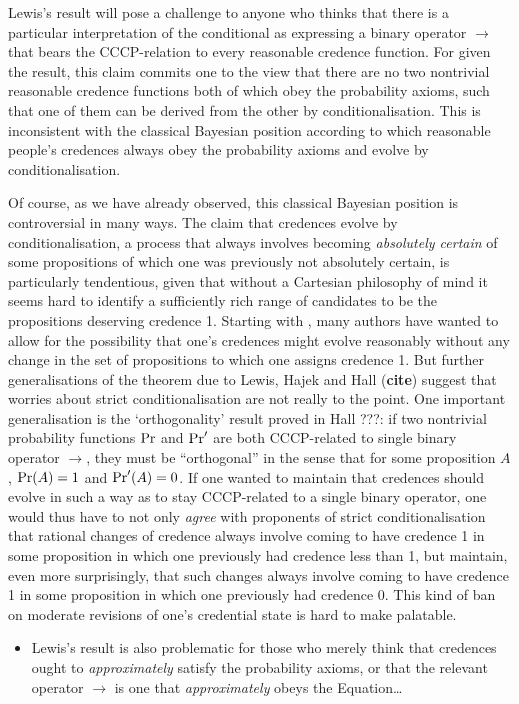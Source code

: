 \documentclass[If.tex]{subfiles}
\begin{document}
Lewis's result will pose a challenge to anyone who thinks that there is a particular interpretation of the conditional as expressing a binary operator $→$ that bears the CCCP-relation to every reasonable credence function. For given the result, this claim commits one to the view that there are no two nontrivial reasonable credence functions both of which obey the probability axioms, such that one of them can be derived from the other by conditionalisation. This is inconsistent with the classical Bayesian position according to which reasonable people's credences always obey the probability axioms and evolve by conditionalisation.

Of course, as we have already observed, this classical Bayesian position is controversial in many ways. The claim that credences evolve by conditionalisation, a process that always involves becoming \emph{absolutely certain} of some propositions of which one was previously not absolutely certain, is particularly tendentious, given that without a Cartesian philosophy of mind it seems hard to identify a sufficiently rich range of candidates to be the propositions deserving credence 1.  Starting with \citet{JeffreySILP}, many authors have wanted to allow for the possibility that one's credences might evolve reasonably without any change in the set of propositions to which one assigns credence 1.  But further generalisations of the theorem due to Lewis, Hajek and Hall (\textbf{cite}) suggest that worries about strict conditionalisation are not really to the point. One important generalisation is the ‘orthogonality’ result proved in Hall ???: if two nontrivial probability functions $\operatorname{Pr}$ and $\operatorname{Pr}'$ are both CCCP-related to single binary operator $→$, they must be “orthogonal” in the sense that for some proposition $A$, $\operatorname{Pr}(A)=1$ and $\operatorname{Pr}'(A)=0$. If one wanted to maintain that credences should evolve in such a way as to stay CCCP-related to a single binary operator, one would thus have to not only \emph{agree} with proponents of strict conditionalisation that rational changes of credence always involve coming to have credence 1 in some proposition in which one previously had credence less than 1, but maintain, even more surprisingly, that such changes always involve coming to have credence 1 in some proposition in which one previously had credence 0. This kind of ban on moderate revisions of one's credential state is hard to make palatable.

\begin{itemize}
\item
  Lewis's result is also problematic for those who merely think that
  credences ought to \emph{approximately} satisfy the probability
  axioms, or that the relevant operator $→$ is one that
  \emph{approximately} obeys the Equation\ldots{}
\end{itemize}
\end{document}
